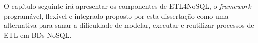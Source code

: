 O capítulo seguinte irá apresentar os componentes de ETL4NoSQL, o \textit{framework} programável, flexível e integrado proposto por esta dissertação como uma alternativa para sanar a dificuldade de modelar, executar e reutilizar processos de ETL em BDs NoSQL.

